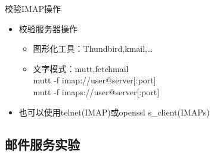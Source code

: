\begin{frame}{校验IMAP操作}
\begin{itemize}
\item 校验服务器操作

\begin{itemize}
\item 图形化工具：Thundbird,kmail,\ldots{}
\item 文字模式：mutt,fetchmail\\
mutt -f imap://user@server{[}:port{]}\\
mutt -f imaps://user@server{[}:port{]}
\end{itemize}
\item 也可以使用telnet(IMAP)或openssl s\_client(IMAPs)
\end{itemize}

\end{frame} 
\subsection{邮件服务实验}


